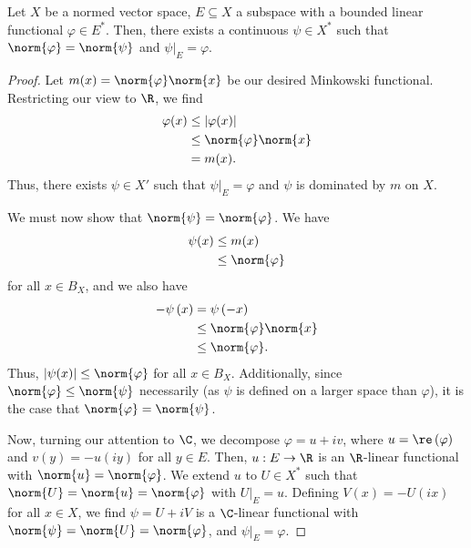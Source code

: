 \documentclass[10pt]{mypackage}
\begin{document}
  \begin{theorem}
    Let $X$ be a normed vector space, $E\subseteq X$ a subspace with a bounded linear functional $\varphi\in E^{\ast}$. Then, there exists a continuous $\psi\in X^{\ast}$ such that $\norm{\varphi} = \norm{\psi}$ and $\psi|_{E} = \varphi$.
  \end{theorem}
  \begin{proof}
    Let $m(x) = \norm{\varphi}\norm{x}$ be our desired Minkowski functional. Restricting our view to $\R$, we find
    \begin{align*}
      \varphi(x) &\leq \left\vert \varphi(x) \right\vert\\
                 &\leq \norm{\varphi}\norm{x}\\
                 &= m(x).
    \end{align*}
    Thus, there exists $\psi\in X'$ such that $\psi|_{E} = \varphi$ and $\psi$ is dominated by $m$ on $X$.\newline

    We must now show that $\norm{\psi}=\norm{\varphi}  $. We have
    \begin{align*}
      \psi(x) &\leq m(x)\\
              &\leq \norm{\varphi}
    \end{align*}
    for all $x\in B_X$, and we also have
    \begin{align*}
      -\psi\left(x\right) &= \psi\left(-x\right)\\
                          &\leq \norm{\varphi}\norm{x}\\
                          &\leq \norm{\varphi}.
    \end{align*}
    Thus, $\left\vert \psi(x) \right\vert\leq \norm{\varphi}$ for all $x\in B_X$. Additionally, since $\norm{\varphi}\leq \norm{\psi}$ necessarily (as $\psi$ is defined on a larger space than $\varphi$), it is the case that $\norm{\varphi} = \norm{\psi}$.\newline

    Now, turning our attention to $\C$, we decompose $\varphi = u + iv$, where $u = \re\left(\varphi\right)$ and $v(y) = -u\left(iy\right)$ for all $y\in E$. Then, $u: E\rightarrow \R$ is an $\R$-linear functional with $\norm{u} = \norm{\varphi}$. We extend $u$ to $U\in X^{\ast}$ such that $\norm{U} = \norm{u} = \norm{\varphi}$ with $U|_{E} = u$. Defining $V(x) = -U(ix)$ for all $x\in X$, we find $\psi = U + iV$ is a $\C$-linear functional with $\norm{\psi} = \norm{U} = \norm{\varphi}$, and $\psi|_{E} = \varphi$.
  \end{proof}
\end{document}
